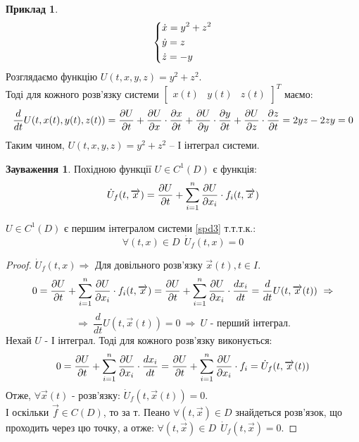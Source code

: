 \documentclass[14pt,a4paper]{scrartcl}
\theoremstyle{definition}
\newtheorem*{example}{Приклад}
\newtheorem*{remark}{Зауваження}
\theoremstyle{definition}
\theoremstyle{definition}
\begin{document}
\begin{example}
  $$
  \begin{dcases}
   \dot{x} = y^2 + z^2\\
   \dot{y} = z \\
   \dot{z} = -y
  \end{dcases}
  $$
  Розглядаємо функцію $U(t, x, y, z) = y^2 + z^2$.\\
  Тоді для кожного розв'язку системи $\begin{bmatrix}
   x(t)&
   y(t)&
   z(t)
  \end{bmatrix}^T$ маємо:
  $$
  \frac{d}{dt} U(t, x(t), y(t), z(t)) = \frac{\partial U}{\partial t} + \frac{\partial U}{\partial x}\cdot \frac{\partial x}{\partial t}  + \frac{\partial U}{\partial y}\cdot \frac{\partial y}{\partial t} +
  \frac{\partial U}{\partial z}\cdot \frac{\partial z}{\partial t} = 2yz - 2zy = 0
  $$
  Таким чином, $U(t,x,y,z)= y^2 + z^2$ -- І інтеграл системи.
\end{example}
\begin{remark}
    Похідною функції $U\in C^1(D) $ є функція:
    $$
    \dot{U}_f (t, \overrightarrow{x}) = \frac{\partial U}{\partial t} +  \sum\limits_{i = 1}^{n}{ \frac{\partial U}{\partial x_i} \cdot f_i(t, \overrightarrow{x})  }
    $$
\end{remark}
\begin{boxteo}
  $U\in C^1(D)$ є першим інтегралом системи \eqref{spd3} т.т.т.к.:
  $$
  \forall (t,x) \in D \ \ \dot{U}_f (t,x) = 0
  $$
\end{boxteo}
\begin{proof}
 \fbox{$\Longleftarrow$} $\dot{U}_f (t,x) \Rightarrow$ Для довільного розв'язку $\overrightarrow{x}(t), t\in I$.
 $$
 0 = \frac{\partial U}{\partial t} +  \sum\limits_{i = 1}^{ n}{ \frac{\partial U}{\partial x_i}  } \cdot f_i (t, \overrightarrow{x}) = \frac{\partial U}{\partial t} +  \sum\limits_{i = 1}^{ n}{ \frac{\partial U}{\partial x_i}  } \cdot \frac{d x_i}{dt} = \frac{d}{dt} U(t, \overrightarrow{x}(t)) \  \Rightarrow
 $$
 $$
\Rightarrow \ \frac{d}{dt} U(t, \overrightarrow{x}(t)) = 0 \ \Rightarrow \ U \text{ - перший інтеграл.}
 $$
\fbox{$\Longrightarrow$} Нехай $U$ - І інтеграл. Тоді для кожного розв'язку виконується:
$$
0 = \frac{\partial U}{\partial t} +  \sum\limits_{i = 1}^{ n}{ \frac{\partial U}{\partial x_i} } \cdot \frac{d x_i}{dt} =  \frac{\partial U}{\partial t} +  \sum\limits_{i = 1}^{ n}{ \frac{\partial U}{\partial x_i} } \cdot f_i = \dot{U}_f (t, \overrightarrow{x}(t))
$$
Отже, $\forall \overrightarrow{x}(t)$ - розв'язку: $\dot{U}_f(t, \overrightarrow{x}(t)) = 0$.\\
І оскільки $\overrightarrow{f} \in C(D)$, то за т. Пеано $\forall (t,\overrightarrow{x}) \in D$ знайдеться розв'язок, що проходить через цю точку, а отже: $\forall (t, \overrightarrow{x}) \in D \ \  \dot{U}_f(t, \overrightarrow{x})=0$.
\end{proof}
\end{document}
